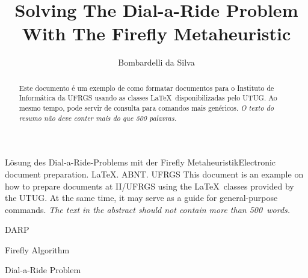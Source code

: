 \documentclass[tuberlin,cic,tc,openright,english,noabntcite]{iiufrgs}
\title{Solving The Dial-a-Ride Problem With The Firefly Metaheuristic}
\author{Bombardelli da Silva}{Fernando}
\begin{document}
\maketitle





\begin{abstract}
    Este documento é um exemplo de como formatar documentos para o
    Instituto de Informática da UFRGS usando as classes \LaTeX\
    disponibilizadas pelo UTUG\@. Ao mesmo tempo, pode servir de consulta
    para comandos mais genéricos. \emph{O texto do resumo não deve
      conter mais do que 500 palavras.}
\end{abstract}

\begin{englishabstract}{Lösung des Dial-a-Ride-Problems mit der Firefly Metaheuristik}{Electronic document preparation. \LaTeX. ABNT. UFRGS}
    This document is an example on how to prepare documents at II/UFRGS
    using the \LaTeX\ classes provided by the UTUG\@. At the same time, it
    may serve as a guide for general-purpose commands. \emph{The text in
      the abstract should not contain more than 500~words.}
\end{englishabstract}

\listoffigures

\listoftables

\begin{listofabbrv}{DARP}
    \item[FA] Firefly Algorithm
    \item[DARP] Dial-a-Ride Problem
\end{listofabbrv}
\end{document}
